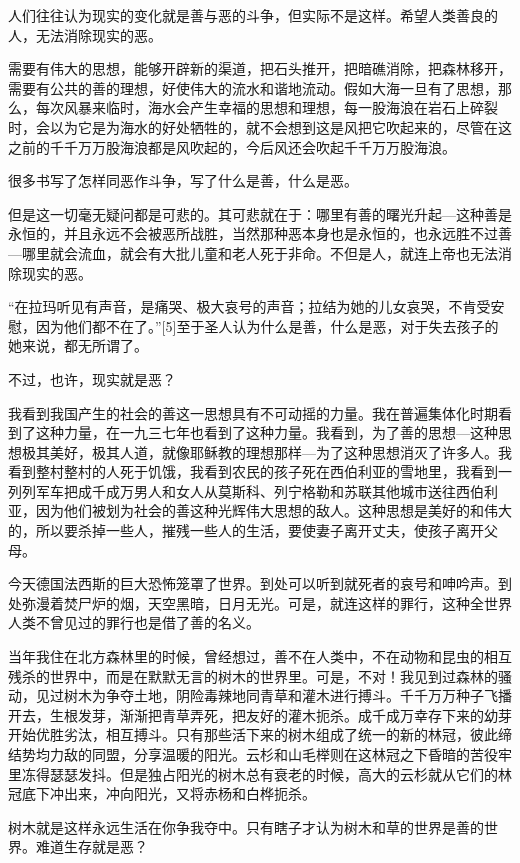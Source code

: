 人们往往认为现实的变化就是善与恶的斗争，但实际不是这样。希望人类善良的人，无法消除现实的恶。

需要有伟大的思想，能够开辟新的渠道，把石头推开，把暗礁消除，把森林移开，需要有公共的善的理想，好使伟大的流水和谐地流动。假如大海一旦有了思想，那么，每次风暴来临时，海水会产生幸福的思想和理想，每一股海浪在岩石上碎裂时，会以为它是为海水的好处牺牲的，就不会想到这是风把它吹起来的，尽管在这之前的千千万万股海浪都是风吹起的，今后风还会吹起千千万万股海浪。

很多书写了怎样同恶作斗争，写了什么是善，什么是恶。

但是这一切毫无疑问都是可悲的。其可悲就在于：哪里有善的曙光升起—这种善是永恒的，并且永远不会被恶所战胜，当然那种恶本身也是永恒的，也永远胜不过善—哪里就会流血，就会有大批儿童和老人死于非命。不但是人，就连上帝也无法消除现实的恶。

“在拉玛听见有声音，是痛哭、极大哀号的声音；拉结为她的儿女哀哭，不肯受安慰，因为他们都不在了。”[5]至于圣人认为什么是善，什么是恶，对于失去孩子的她来说，都无所谓了。

不过，也许，现实就是恶？

我看到我国产生的社会的善这一思想具有不可动摇的力量。我在普遍集体化时期看到了这种力量，在一九三七年也看到了这种力量。我看到，为了善的思想—这种思想极其美好，极其人道，就像耶稣教的理想那样—为了这种思想消灭了许多人。我看到整村整村的人死于饥饿，我看到农民的孩子死在西伯利亚的雪地里，我看到一列列军车把成千成万男人和女人从莫斯科、列宁格勒和苏联其他城市送往西伯利亚，因为他们被划为社会的善这种光辉伟大思想的敌人。这种思想是美好的和伟大的，所以要杀掉一些人，摧残一些人的生活，要使妻子离开丈夫，使孩子离开父母。

今天德国法西斯的巨大恐怖笼罩了世界。到处可以听到就死者的哀号和呻吟声。到处弥漫着焚尸炉的烟，天空黑暗，日月无光。可是，就连这样的罪行，这种全世界人类不曾见过的罪行也是借了善的名义。

当年我住在北方森林里的时候，曾经想过，善不在人类中，不在动物和昆虫的相互残杀的世界中，而是在默默无言的树木的世界里。可是，不对！我见到过森林的骚动，见过树木为争夺土地，阴险毒辣地同青草和灌木进行搏斗。千千万万种子飞播开去，生根发芽，渐渐把青草弄死，把友好的灌木扼杀。成千成万幸存下来的幼芽开始优胜劣汰，相互搏斗。只有那些活下来的树木组成了统一的新的林冠，彼此缔结势均力敌的同盟，分享温暖的阳光。云杉和山毛榉则在这林冠之下昏暗的苦役牢里冻得瑟瑟发抖。但是独占阳光的树木总有衰老的时候，高大的云杉就从它们的林冠底下冲出来，冲向阳光，又将赤杨和白桦扼杀。

树木就是这样永远生活在你争我夺中。只有瞎子才认为树木和草的世界是善的世界。难道生存就是恶？

